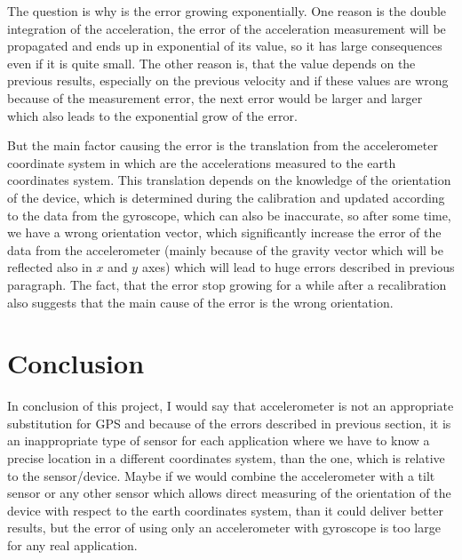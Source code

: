 \documentclass[hidelinks,a4paper]{article}
\begin{document}
The question is why is the error growing exponentially. One reason is the double integration of the acceleration, the error of the acceleration measurement will be propagated\cite{UNCERNITY} and ends up in exponential of its value, so it has large consequences even if it is quite small. The other reason is, that the value depends on the previous results, especially on the previous velocity and if these values are wrong because of the measurement error, the next error would be larger and larger which also leads to the exponential grow of the error.\par
But the main factor causing the error is the translation from the accelerometer coordinate system in which are the accelerations measured to the earth coordinates system. This translation depends on the knowledge of the orientation of the device, which is determined during the calibration and updated according to the data from the gyroscope, which can also be inaccurate, so after some time, we have a wrong orientation vector, which significantly increase the error of the data from the accelerometer (mainly because of the gravity vector which will be reflected also in $x$ and $y$ axes) which will lead to huge errors described in previous paragraph. The fact, that the error stop growing for a while after a recalibration also suggests that the main cause of the error is the wrong orientation.

\section{Conclusion}
In conclusion of this project, I would say that accelerometer is not an appropriate substitution for GPS and because of the errors described in previous section, it is an inappropriate type of sensor for each application where we have to know a precise location in a different coordinates system, than the one,
which is relative to the sensor/device. Maybe if we would combine the accelerometer with a tilt sensor or any other sensor which allows direct measuring of the orientation of the device with respect to the earth coordinates system, than it could deliver better results, but the error of using only an accelerometer with gyroscope is too large for any real application.\par

\clearpage
{}
\nocite{ACCGyro}
\nocite{BoardGH}
\nocite{NMEA}
\nocite{GYRO}
\printbibliography
\end{document}
